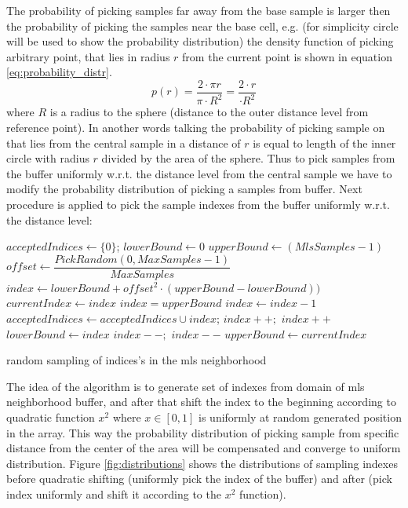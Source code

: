 The probability of picking samples far away from the base sample is larger then the probability of picking the samples near the base cell, e.g. (for simplicity circle will be used to show  the probability distribution) the density  function of picking arbitrary point, that lies in radius $r$ from the current point is shown in equation \ref{eq:probability_distr}.
\begin{equation}
	p(r) = \dfrac{2 \cdot \pi r}{\pi \cdot R^2} = \dfrac{2 \cdot r}{\cdot R^2}
	\label{eq:probability_distr}
\end{equation}
where $R$ is a radius to the sphere (distance to the outer distance level from reference point). In another words talking the probability of picking sample on that lies from the central sample in a distance of $r$ is equal to length of the inner circle with radius $r$ divided by the area of the sphere.
Thus to pick samples from the buffer uniformly w.r.t. the distance level from the central sample we have to modify the probability distribution of picking a samples from buffer. Next procedure is applied to pick the sample indexes from the buffer uniformly w.r.t. the distance level:
\begin{algorithm}[H]
	\scriptsize
	\begin{algorithmic}
			\State $acceptedIndices \gets \{0\}$;
			\State $lowerBound \gets 0$
			\State $upperBound \gets (MlsSamples - 1)$
				\State $offset \gets \dfrac{PickRandom(0, MaxSamples - 1)}{MaxSamples}$
				\State $index \gets lowerBound + offset^2 \cdot (upperBound - lowerBound))$
				\State $currentIndex \gets index$
						\State $index = upperBound$
					\Else
						\State $index \gets index - 1$
					\EndIf
				\EndWhile
				\State $acceptedIndices \gets acceptedIndices \cup index$;
					\State $index++;$
						\State $index++$
					\EndWhile
					\State $lowerBound \gets index$
				\Else 
						\State $index--;$
							\State $index--$
						\EndWhile
						\State $upperBound \gets currentIndex$
					\EndIf
				\EndIf
			\EndFor
	\end{algorithmic}
	\caption{random sampling of indices's in the mls neighborhood}
	\label{alg:mls_montecarlo_sampling}
\end{algorithm}
The idea of the algorithm is to generate set of indexes from domain of mls neighborhood buffer, and after that shift the index to the beginning according to quadratic function $x^2$ where $x\in [0,1]$ is uniformly at random generated position in the array. This way the probability distribution of picking sample from specific distance from the center of the area will be compensated and converge to uniform distribution. Figure \ref{fig:distributions} shows the distributions of sampling indexes before quadratic shifting (uniformly pick the index of the buffer) and after (pick index uniformly and shift it according to the $x^2$ function).\\
